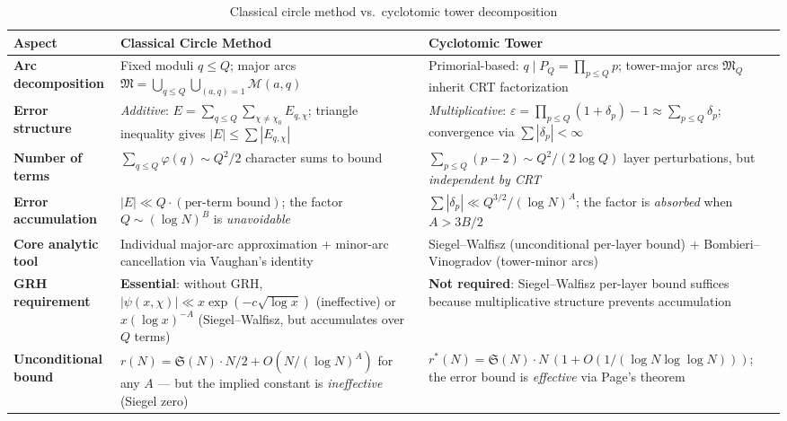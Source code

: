 \documentclass[11pt,a4paper]{article}
\theoremstyle{remark}
\newcommand{\mM}{\mathfrak{M}}
\begin{document}
\begin{table}[ht]
\centering
\caption{Classical circle method vs.\ cyclotomic tower decomposition}
\label{tab:comparison}
\small
\renewcommand{\arraystretch}{1.35}
\begin{tabular}{@{}p{3.2cm}|p{5.0cm}|p{5.0cm}@{}}
\toprule
\textbf{Aspect} & \textbf{Classical Circle Method} & \textbf{Cyclotomic Tower} \\
\midrule

\textbf{Arc decomposition}
  & Fixed moduli $q \leq Q$; major arcs $\mM = \bigcup_{q \leq Q}\bigcup_{(a,q)=1} \mathcal{M}(a,q)$
  & Primorial-based: $q \mid P_Q = \prod_{p \leq Q}p$; tower-major arcs $\mM_Q$ inherit CRT factorization \\

\textbf{Error structure}
  & \emph{Additive}: $E = \sum_{q \leq Q}\sum_{\chi \neq \chi_0} E_{q,\chi}$; triangle inequality gives $|E| \leq \sum |E_{q,\chi}|$
  & \emph{Multiplicative}: $\varepsilon = \prod_{p \leq Q}(1+\delta_p) - 1 \approx \sum_{p \leq Q}\delta_p$; convergence via $\sum|\delta_p| < \infty$ \\

\textbf{Number of terms}
  & $\sum_{q \leq Q}\varphi(q) \sim Q^2/2$ character sums to bound
  & $\sum_{p \leq Q}(p-2) \sim Q^2/(2\log Q)$ layer perturbations, but \emph{independent by CRT} \\

\textbf{Error accumulation}
  & $|E| \ll Q \cdot (\text{per-term bound})$; the factor $Q \sim (\log N)^B$ is \emph{unavoidable}
  & $\sum|\delta_p| \ll Q^{3/2}/(\log N)^A$; the factor is \emph{absorbed} when $A > 3B/2$ \\

\textbf{Core analytic tool}
  & Individual major-arc approximation + minor-arc cancellation via Vaughan's identity
  & Siegel--Walfisz (unconditional per-layer bound) + Bombieri--Vinogradov (tower-minor arcs) \\

\textbf{GRH requirement}
  & \textbf{Essential}: without GRH, $|\psi(x,\chi)| \ll x\exp(-c\sqrt{\log x})$ (ineffective) or $x(\log x)^{-A}$ (Siegel--Walfisz, but accumulates over $Q$ terms)
  & \textbf{Not required}: Siegel--Walfisz per-layer bound suffices because multiplicative structure prevents accumulation \\

\textbf{Unconditional bound}
  & $r(N) = \mathfrak{S}(N)\cdot N/2 + O(N/(\log N)^A)$ for any $A$ --- but the implied constant is \emph{ineffective} (Siegel zero)
  & $r^*(N) = \mathfrak{S}(N)\cdot N\,(1 + O(1/(\log N\log\log N)))$; the error bound is \emph{effective} via Page's theorem \\


\end{tabular}
\end{table}
\end{document}
